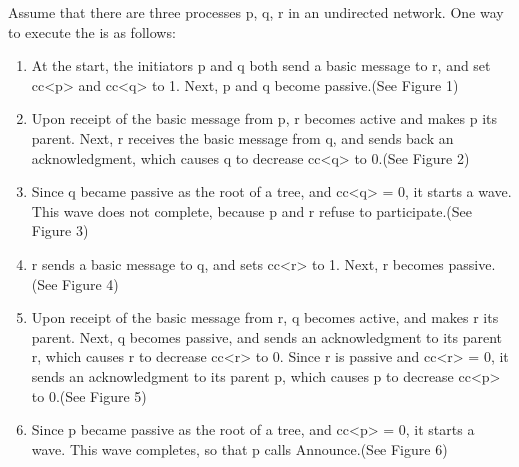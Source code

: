\documentclass[letterpaper,10pt,english]{sphinxmanual}
\begin{document}
\sphinxAtStartPar
Assume that there are three processes p, q, r in an undirected network. One way to execute the {\hyperref[\detokenize{docs/ShavitFranchezAlg/algorithm:shavitfranchesterminationdetectionalgorithm}]{}} is as follows:
\begin{enumerate}
%
\item {} 
\sphinxAtStartPar
At the start, the initiators p and q both send a basic message to r, and set cc\textless{}p\textgreater{} and cc\textless{}q\textgreater{} to 1. Next, p and q become passive.(See Figure 1)

\item {} 
\sphinxAtStartPar
Upon receipt of the basic message from p, r becomes active and makes p its parent. Next, r receives the basic message from q, and sends back an acknowledgment, which causes q to decrease cc\textless{}q\textgreater{} to 0.(See Figure 2)

\item {} 
\sphinxAtStartPar
Since q became passive as the root of a tree, and cc\textless{}q\textgreater{} = 0, it starts a wave. This wave does not complete, because p and r refuse to participate.(See Figure 3)

\item {} 
\sphinxAtStartPar
r sends a basic message to q, and sets cc\textless{}r\textgreater{} to 1. Next, r becomes passive.(See Figure 4)

\item {} 
\sphinxAtStartPar
Upon receipt of the basic message from r, q becomes active, and makes r its parent. Next, q becomes passive, and sends an acknowledgment to its parent r, which causes r to decrease cc\textless{}r\textgreater{} to 0. Since r is passive and cc\textless{}r\textgreater{} = 0, it sends an acknowledgment to its parent p, which causes p to decrease cc\textless{}p\textgreater{} to 0.(See Figure 5)

\item {} 
\sphinxAtStartPar
Since p became passive as the root of a tree, and cc\textless{}p\textgreater{} = 0, it starts a wave. This wave completes, so that p calls Announce.(See Figure 6)

\end{enumerate}
\end{document}
